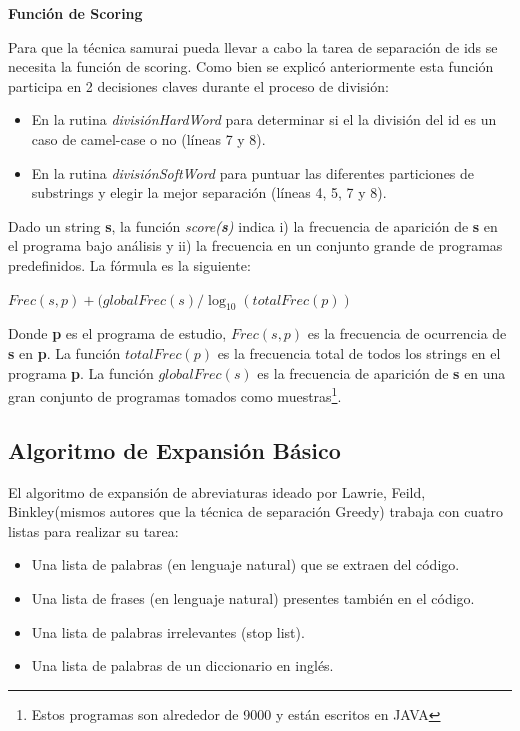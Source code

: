 \documentclass[a4paper,12pt]{report}
\begin{document}
\pagebreak
\noindent \textbf{Función de Scoring}

Para que la técnica samurai pueda llevar a cabo la tarea de separación de ids se necesita la función de scoring. Como bien se explicó anteriormente esta función participa en 2 decisiones claves durante el proceso de división:

\begin{itemize}
\itemsep0em%
\item En la rutina \textit{divisiónHardWord} para determinar si el la división del id es un caso de camel-case o no (líneas 7 y 8).

\item En la rutina \textit{divisiónSoftWord} para puntuar las diferentes particiones de substrings y elegir la mejor separación (líneas 4, 5, 7 y 8).
\end{itemize}

Dado un string \textbf{s}, la función \textit{score(\textbf{s})} indica i) la frecuencia de aparición de \textbf{s} en el programa bajo análisis y ii) la frecuencia en un conjunto grande de programas predefinidos. La fórmula es la siguiente:

\begin{center}
$Frec(s,p) + ( globalFrec(s) / \log_{10}(totalFrec(p) )$
\end{center}

Donde \textbf{p} es el programa de estudio, $Frec(s,p)$ es la frecuencia de ocurrencia de \textbf{s} en \textbf{p}. La función $totalFrec(p)$ es la frecuencia total de todos los strings en el programa \textbf{p}. La función $globalFrec(s)$ es la frecuencia de aparición de \textbf{s} en una gran conjunto de programas tomados como muestras\footnote[1]{Estos programas son alrededor de 9000 y están escritos en JAVA}\cite{EHPV09}.

\pagebreak
\subsection{Algoritmo de Expansión Básico}

El algoritmo de expansión de abreviaturas ideado por Lawrie, Feild, Binkley(mismos autores que la técnica de separación Greedy)\cite{LFBEX07} trabaja con cuatro listas para realizar su tarea:

\begin{itemize}
\itemsep0em%
\item Una lista de palabras (en lenguaje natural) que se extraen del código.
\item Una lista de frases (en lenguaje natural) presentes también en el código.
\item Una lista de palabras irrelevantes (stop list).
\item Una lista de palabras de un diccionario en inglés.
\end{itemize}
\end{document}
